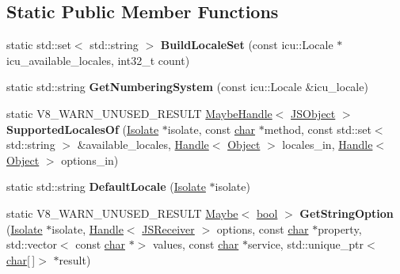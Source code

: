 \subsection*{Static Public Member Functions}
\begin{DoxyCompactItemize}
\item 
\mbox{\label{classv8_1_1internal_1_1Intl_a5438999ce8a969dbe4e22e1492e6d5f9}} 
static std\+::set$<$ std\+::string $>$ {\bfseries Build\+Locale\+Set} (const icu\+::\+Locale $\ast$icu\+\_\+available\+\_\+locales, int32\+\_\+t count)
\item 
\mbox{\label{classv8_1_1internal_1_1Intl_a2091add6bc73b348d3ec7807cb0d2f9c}} 
static std\+::string {\bfseries Get\+Numbering\+System} (const icu\+::\+Locale \&icu\+\_\+locale)
\item 
\mbox{\label{classv8_1_1internal_1_1Intl_a7e28ba7f5edcc1eb73a89cb945ab689d}} 
static V8\+\_\+\+W\+A\+R\+N\+\_\+\+U\+N\+U\+S\+E\+D\+\_\+\+R\+E\+S\+U\+LT \mbox{\hyperlink{classv8_1_1internal_1_1MaybeHandle}{Maybe\+Handle}}$<$ \mbox{\hyperlink{classv8_1_1internal_1_1JSObject}{J\+S\+Object}} $>$ {\bfseries Supported\+Locales\+Of} (\mbox{\hyperlink{classv8_1_1internal_1_1Isolate}{Isolate}} $\ast$isolate, const \mbox{\hyperlink{classchar}{char}} $\ast$method, const std\+::set$<$ std\+::string $>$ \&available\+\_\+locales, \mbox{\hyperlink{classv8_1_1internal_1_1Handle}{Handle}}$<$ \mbox{\hyperlink{classv8_1_1internal_1_1Object}{Object}} $>$ locales\+\_\+in, \mbox{\hyperlink{classv8_1_1internal_1_1Handle}{Handle}}$<$ \mbox{\hyperlink{classv8_1_1internal_1_1Object}{Object}} $>$ options\+\_\+in)
\item 
\mbox{\label{classv8_1_1internal_1_1Intl_a7368e895d4205fbec92fc34d82a59ae5}} 
static std\+::string {\bfseries Default\+Locale} (\mbox{\hyperlink{classv8_1_1internal_1_1Isolate}{Isolate}} $\ast$isolate)
\item 
\mbox{\label{classv8_1_1internal_1_1Intl_a7be5db6b78983b21cfe99056cef1d284}} 
static V8\+\_\+\+W\+A\+R\+N\+\_\+\+U\+N\+U\+S\+E\+D\+\_\+\+R\+E\+S\+U\+LT \mbox{\hyperlink{classv8_1_1Maybe}{Maybe}}$<$ \mbox{\hyperlink{classbool}{bool}} $>$ {\bfseries Get\+String\+Option} (\mbox{\hyperlink{classv8_1_1internal_1_1Isolate}{Isolate}} $\ast$isolate, \mbox{\hyperlink{classv8_1_1internal_1_1Handle}{Handle}}$<$ \mbox{\hyperlink{classv8_1_1internal_1_1JSReceiver}{J\+S\+Receiver}} $>$ options, const \mbox{\hyperlink{classchar}{char}} $\ast$property, std\+::vector$<$ const \mbox{\hyperlink{classchar}{char}} $\ast$$>$ values, const \mbox{\hyperlink{classchar}{char}} $\ast$service, std\+::unique\+\_\+ptr$<$ \mbox{\hyperlink{classchar}{char}}\mbox{[}$\,$\mbox{]}$>$ $\ast$result)
$$
\end{DoxyCompactItemize}
